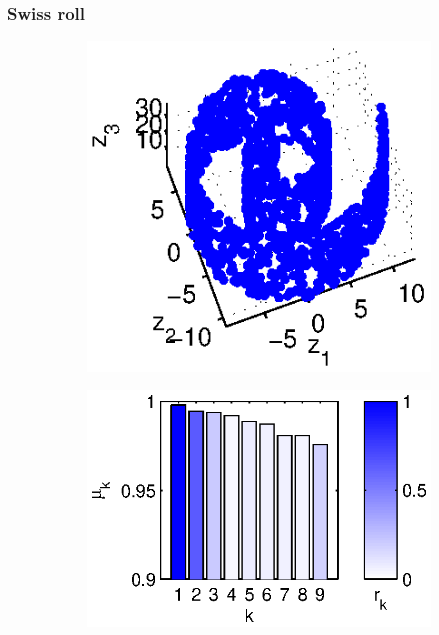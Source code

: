 \documentclass[3p]{elsarticle}
\begin{document}
\subsubsection{Swiss roll}

\begin{figure}[!t]
%
\begin{subfigure}{0.2\textwidth}
\centering
\includegraphics[width=\textwidth]{swissroll1}
\caption{}
\label{subfig:swissroll1}
\end{subfigure}
%
\begin{subfigure}{0.25\textwidth}
\centering
\includegraphics[width=\textwidth]{swissroll1_evals}

\end{subfigure}
\end{figure}
\end{document}
